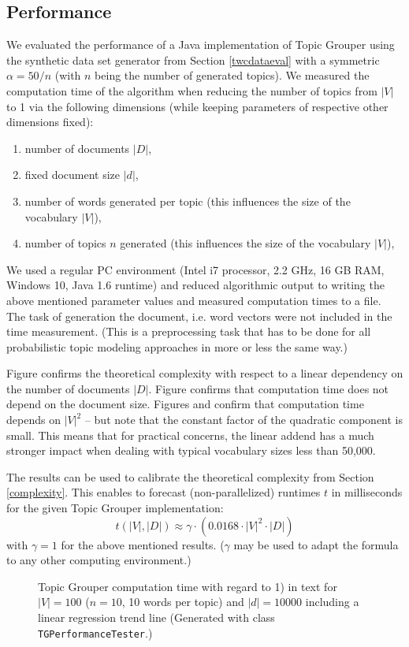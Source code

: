 \documentclass[10pt, a4paper, oneside]{article}
\begin{document}
\subsection{Performance}

We evaluated the performance of a Java implementation of Topic Grouper 
using the synthetic data set generator from Section \ref{twcdataeval} with a symmetric $\alpha = 50 / n$ (with $n$ being the number of generated topics).
We measured the computation time of the algorithm when reducing the number of topics from $|V|$ to 1 via the following dimensions (while keeping  parameters of respective other dimensions fixed):
\begin{enumerate}
\item number of documents $|D|$,
\item fixed document size $|d|$,
\item number of words generated per topic (this influences the size of the vocabulary $|V|$),
\item number of topics $n$ generated (this influences the size of the vocabulary $|V|$),
\end{enumerate}
We used a regular PC environment (Intel i7 processor, 2.2 GHz, 16 GB RAM, Windows 10, Java 1.6 runtime) and reduced algorithmic output to writing the above mentioned parameter values and measured computation times to a file.
The task of generation the document, i.e. word vectors were not included in the time measurement.
(This is a preprocessing task that has to be done for all probabilistic topic modeling approaches in more or less the same way.)

Figure \cite{perf1} confirms the theoretical complexity with respect to a linear dependency on the number of documents $|D|$.
Figure \cite{perf2} confirms that computation time does not depend on the document size.
Figures \cite{perf3} and \cite{perf4} confirm that computation time depends on $|V|^2$ -- but note that the constant factor of the quadratic component is small. This means that for practical concerns, the linear addend has a much stronger impact when dealing with typical vocabulary sizes less than 50,000.

The results can be used to calibrate the theoretical complexity from Section \ref{complexity}. This enables to forecast (non-parallelized) runtimes $t$ in milliseconds for the given Topic Grouper implementation:
\[ t(|V|,|D|) \approx \gamma \cdot (0.0168 \cdot |V|^2 \cdot |D|)\]
with $\gamma = 1$ for the above mentioned results. ($\gamma$ may be used to adapt the formula to any other computing environment.) 
\begin{figure}
\caption{Topic Grouper computation time with regard to 1) in text for $|V| = 100$ ($n = 10$, 10 words per topic) and $|d| = 10000$ including a linear regression trend line (Generated with class \texttt{TGPerformanceTester}.)}
\label{perf1}
\end{figure}
\end{document}
